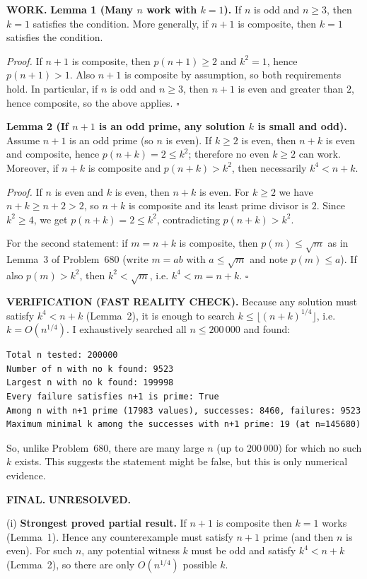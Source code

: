 \textbf{WORK.}
\textbf{Lemma 1 (Many $n$ work with $k=1$).}
If $n$ is odd and $n\ge3$, then $k=1$ satisfies the condition.
More generally, if $n+1$ is composite, then $k=1$ satisfies the condition.

\emph{Proof.}
If $n+1$ is composite, then $p(n+1)\ge 2$ and $k^{2}=1$, hence $p(n+1)>1$.
Also $n+1$ is composite by assumption, so both requirements hold.
In particular, if $n$ is odd and $n\ge3$, then $n+1$ is even and greater than $2$, hence composite, so the above applies.
\hfill$\square$

\textbf{Lemma 2 (If $n+1$ is an odd prime, any solution $k$ is small and odd).}
Assume $n+1$ is an odd prime (so $n$ is even). If $k\ge2$ is even, then $n+k$ is even and composite, hence $p(n+k)=2\le k^{2}$; therefore no even $k\ge2$ can work.
Moreover, if $n+k$ is composite and $p(n+k)>k^{2}$, then necessarily $k^{4}<n+k$.

\emph{Proof.}
If $n$ is even and $k$ is even, then $n+k$ is even. For $k\ge2$ we have $n+k\ge n+2>2$, so $n+k$ is composite and its least prime divisor is $2$. Since $k^{2}\ge4$, we get $p(n+k)=2\le k^{2}$, contradicting $p(n+k)>k^{2}$.

For the second statement: if $m=n+k$ is composite, then $p(m)\le \sqrt m$ as in Lemma~3 of Problem~680 (write $m=ab$ with $a\le\sqrt m$ and note $p(m)\le a$). If also $p(m)>k^{2}$, then $k^{2}<\sqrt m$, i.e. $k^{4}<m=n+k$.
\hfill$\square$

\textbf{VERIFICATION (FAST REALITY CHECK).}
Because any solution must satisfy $k^{4}<n+k$ (Lemma~2), it is enough to search $k\le \lfloor (n+k)^{1/4}\rfloor$, i.e. $k=O(n^{1/4})$.
I exhaustively searched all $n\le 200\,000$ and found:
\begin{verbatim}
Total n tested: 200000
Number of n with no k found: 9523
Largest n with no k found: 199998
Every failure satisfies n+1 is prime: True
Among n with n+1 prime (17983 values), successes: 8460, failures: 9523
Maximum minimal k among the successes with n+1 prime: 19 (at n=145680)
\end{verbatim}
So, unlike Problem~680, there are many large $n$ (up to $200\,000$) for which no such $k$ exists.
This suggests the statement might be false, but this is only numerical evidence.

\textbf{FINAL.}
\textbf{UNRESOLVED.}

(i) \textbf{Strongest proved partial result.}
If $n+1$ is composite then $k=1$ works (Lemma~1). Hence any counterexample must satisfy $n+1$ prime (and then $n$ is even). For such $n$, any potential witness $k$ must be odd and satisfy $k^{4}<n+k$ (Lemma~2), so there are only $O(n^{1/4})$ possible $k$.


